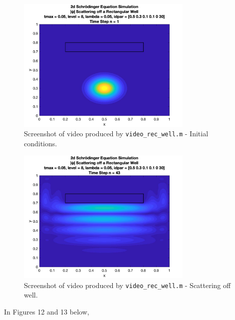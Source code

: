 \documentclass[10pt]{article}
\def\code#1{\texttt{#1}} %
\begin{document}
\begin{figure}[H]
\centering
\includegraphics[width=0.75\textwidth]{problem2/rec_well_1.png}
\caption{Screenshot of video produced by \code{video\_rec\_well.m} - Initial conditions.}
\end{figure}
\begin{figure}[H]
\centering
\includegraphics[width=0.75\textwidth]{problem2/rec_well_2.png}
\caption{Screenshot of video produced by \code{video\_rec\_well.m} - Scattering off well.}
\end{figure}

In Figures 12 and 13 below, 
\end{document}
